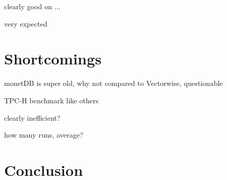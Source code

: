 \documentclass{paper}
\begin{document}
	clearly good on ...
	
	very expected
	
	\section{Shortcomings}
	
	monetDB is super old, why not compared to Vectorwise, questionable 
	
	TPC-H benchmark like others
	
	clearly inefficient? 
	
	how many runs, average?
	
	
	\section{Conclusion}
	


	
\end{document}
